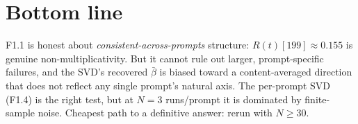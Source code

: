 \documentclass[11pt]{article}
\newcommand{\Rt}{R(t)}
\newcommand{\bbar}{\bar\beta}
\begin{document}
\section{Bottom line}

F1.1 is honest about \emph{consistent-across-prompts} structure:
\(\Rt[199] \approx 0.155\) is genuine non-multiplicativity.
But it cannot rule out larger, prompt-specific failures,
and the SVD's recovered \(\bbar\) is biased toward a content-averaged direction
that does not reflect any single prompt's natural axis.
The per-prompt SVD (F1.4) is the right test,
but at \(N=3\) runs/prompt it is dominated by finite-sample noise.
Cheapest path to a definitive answer: rerun with \(N\geq 30\).
\end{document}
